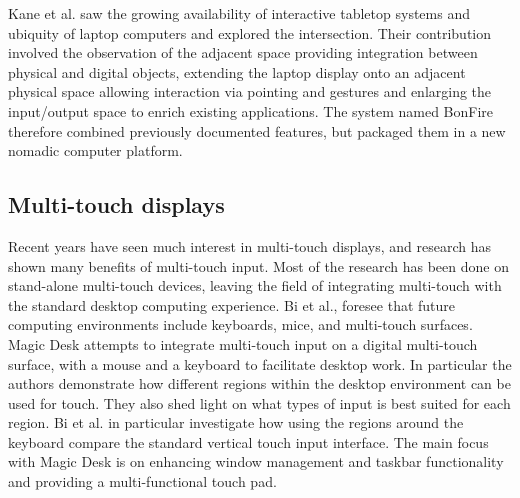 Kane et al. \cite{kane2009bonfire} saw the growing availability of interactive tabletop systems and ubiquity of laptop computers and explored the intersection. Their contribution involved the observation of the adjacent space providing integration between physical and digital objects, extending the laptop display onto an adjacent physical space allowing interaction via pointing and gestures and enlarging the input/output space to enrich existing applications. The system named BonFire therefore combined previously documented features, but packaged them in a new nomadic computer platform.


\subsection{Multi-touch displays} %
\label{sub:multi_touch_displays}

Recent years have seen much interest in multi-touch displays, and research has shown many benefits of multi-touch input. Most of the research has been done on stand-alone multi-touch devices, leaving the field of integrating multi-touch with the standard desktop computing experience. Bi et al.\cite{bi2011magic}, foresee that future computing environments include keyboards, mice, and multi-touch surfaces.\\
Magic Desk\cite{bi2011magic} attempts to integrate multi-touch input on a digital multi-touch surface, with a mouse and a keyboard to facilitate desktop work. In particular the authors demonstrate how different regions within the desktop environment can be used for touch. They also shed light on what types of input is best suited for each region. Bi et al. in particular investigate how using the regions around the keyboard compare the standard vertical touch  input interface. The main focus with Magic Desk is on enhancing window management and taskbar functionality and providing a multi-functional touch pad.


